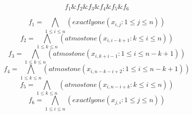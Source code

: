 $$f_{1} \& f_{2} \& f_{3}  \& f_{4} \& f_{5} \& f_{6} $$

$$f_{1}=\bigwedge \limits_{1\leq i\leq n}(exactlyone(x_{i,j} : 1\leq j\leq n))$$
$$f_{2}= \bigwedge \limits_{1\leq k\leq n}(atmostone(x_{i, i-k+1} :k\leq i\leq n))$$
$$f_{3}= \bigwedge \limits_{1\leq k\leq n} (atmostone(x_{i, k+i-1} : 1\leq i\leq n-k+1))$$
$$f_{4}= \bigwedge \limits_{1\leq k\leq n} (atmostone(x_{i, n-k-i+2} : 1\leq i\leq n-k+1))$$
$$f_{5}= \bigwedge \limits_{1\leq k\leq n} (atmostone(x_{i, n-i+k}: k\leq i\leq n))$$
$$f_{6}=\bigwedge \limits_{1\leq i\leq n}(exactlyone(x_{j,i} : 1\leq j\leq n))$$